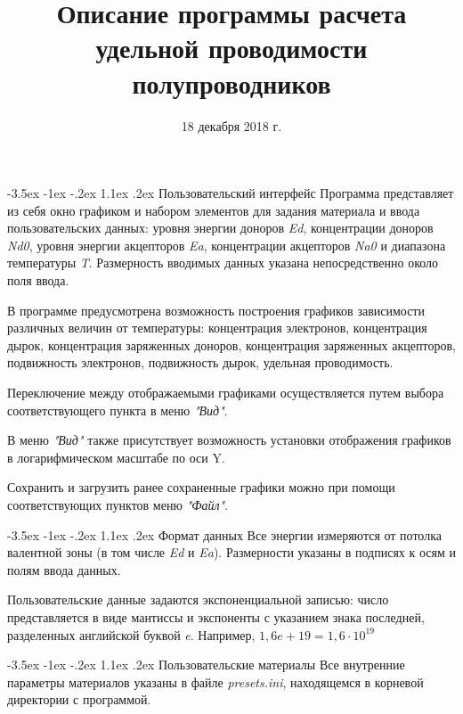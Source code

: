\documentclass[12pt,a4paper]{extarticle}
\title{Описание программы расчета удельной проводимости полупроводников}
\date{18 декабря 2018 г.}
\makeatletter
\renewcommand\section{\@startsection{section}{1}{\z@}%
	{-3.5ex \@plus -1ex \@minus -.2ex}%
	{1.1ex \@plus.2ex}%
	{\normalfont\normalfont\bfseries}}%
\makeatother
\begin{document}
\maketitle

\section{Пользовательский интерфейс}
Программа представляет из себя окно графиком и набором элементов для задания материала и ввода пользовательских данных: уровня энергии доноров \textit{Ed}, концентрации доноров \textit{Nd0}, уровня энергии акцепторов \textit{Ea}, концентрации акцепторов \textit{Na0} и диапазона температуры \textit{T}. Размерность вводимых данных указана непосредственно около поля ввода.

В программе предусмотрена возможность построения графиков зависимости различных величин от температуры: концентрация электронов, концентрация дырок, концентрация заряженных доноров, концентрация заряженных акцепторов, подвижность электронов, подвижность дырок, удельная проводимость.

Переключение между отображаемыми графиками осуществляется путем выбора соответствующего пункта в меню \textit{"Вид"}.

В меню \textit{"Вид"} также присутствует возможность установки отображения графиков в логарифмическом масштабе по оси Y.

Сохранить и загрузить ранее сохраненные графики можно при помощи соответствующих пунктов меню \textit{"Файл"}.

\section{Формат данных}
Все энергии измеряются от потолка валентной зоны (в том числе \textit{Ed} и \textit{Ea}). Размерности указаны в подписях к осям и полям ввода данных.

Пользовательские данные задаются экспоненциальной записью: число представляется в виде мантиссы и экспоненты с указанием знака последней, разделенных английской буквой \textit{e}. Например, $1,6e+19 = 1,6 \cdot 10^{19}$

\section{Пользовательские материалы}
Все внутренние параметры материалов указаны в файле \textit{presets.ini}, находящемся в корневой директории с программой.
\end{document}
